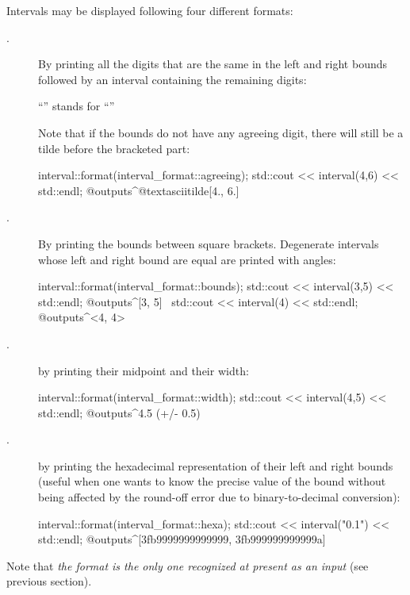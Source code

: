 \documentclass{manual}
\newcommand{\itv}[2]{\ensuremath{[#1,\,#2]}}
\begin{document}
Intervals may be displayed following four different formats:
\begin{description}
\item[.] By printing all the digits that are the same in the left and right bounds
followed by an interval containing the remaining digits:
\begin{center}
``\element{3.141\textasciitilde[5926, 6001]}'' stands for
``\element{\itv{3.1415926}{3.1416001}}''
\end{center}
Note that if the bounds do not have any agreeing digit, there will still be a tilde before the bracketed part:
\begin{example}
 interval::format(interval_format::agreeing);
 std::cout << interval(4,6) << std::endl;
 @outputs^@textasciitilde[4., 6.]~
\end{example}

\item[.] By printing the bounds between square brackets.
Degenerate intervals whose left and right bound are equal are printed with angles:
\begin{example}
 interval::format(interval_format::bounds);
 std::cout << interval(3,5) << std::endl;
 @outputs^[3, 5]~
 std::cout << interval(4) << std::endl;
 @outputs^<4, 4>~
\end{example}

\item[.] by printing their midpoint and their width:
\begin{example}
 interval::format(interval_format::width);
 std::cout << interval(4,5) << std::endl;
 @outputs^4.5 (+/- 0.5)~
\end{example}

\item[.] by printing the hexadecimal representation of their left and right
bounds (useful when one wants to know the precise value of the bound without being
affected by the round-off error due to binary-to-decimal conversion):
\begin{example}
 interval::format(interval_format::hexa);
 std::cout << interval("0.1") << std::endl;
 @outputs^[3fb9999999999999, 3fb999999999999a]~
\end{example}

\end{description}

\medskip
Note that \emph{the  format is the only one recognized at present as an input} (see previous section).
\medskip
\end{document}
